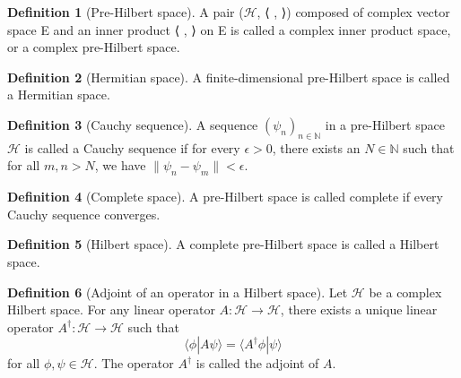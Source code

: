 \documentclass[oneside, a4paper, onecolumn, 11pt]{article}
\theoremstyle{definition}
\newtheorem{definition}{Definition}[section]
\theoremstyle{plain}
\theoremstyle{remark}
\begin{document}
\begin{definition}[Pre-Hilbert space]
  A pair ($\mathcal{H}$, ⟨ , ⟩) composed of complex vector space E and an inner product ⟨ , ⟩ on E
is called a complex inner product space, or a complex pre-Hilbert space.
\end{definition}

\begin{definition}[Hermitian space]
  A finite-dimensional pre-Hilbert space is called a Hermitian space.
\end{definition}

\begin{definition}[Cauchy sequence]
  A sequence $(\psi_n)_{n \in \mathbb{N}}$ in a pre-Hilbert space $\mathcal{H}$ is called a Cauchy sequence if for every $\epsilon > 0$, there exists an $N \in \mathbb{N}$ such that for all $m, n > N$, we have $\|\psi_n - \psi_m\| < \epsilon$.
\end{definition}

\begin{definition}[Complete space]
  A pre-Hilbert space is called complete if every Cauchy sequence converges.
\end{definition}

\begin{definition}[Hilbert space]
  A complete pre-Hilbert space is called a Hilbert space.
\end{definition}

\begin{definition}[Adjoint of an operator in a Hilbert space]
  Let $\mathcal{H}$ be a complex Hilbert space. For any linear operator $A : \mathcal{H} \to \mathcal{H}$, there exists a unique linear operator $A^{\dagger} : \mathcal{H} \to \mathcal{H}$ such that
  \begin{equation}
    \langle \phi | A\psi \rangle = \langle A^{\dagger}\phi | \psi \rangle
  \end{equation}
  for all $\phi, \psi \in \mathcal{H}$. The operator $A^{\dagger}$ is called the adjoint of $A$.
\end{definition}
\end{document}
